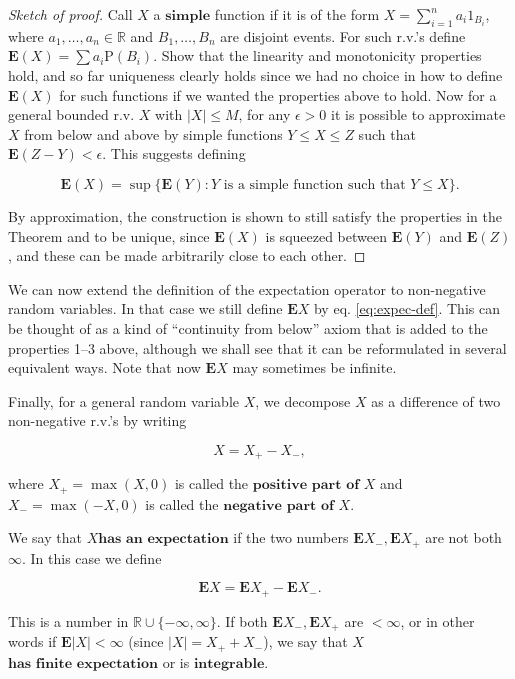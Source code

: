 \documentclass[11pt]{report}
\newcommand{\R}{\mathbb{R}}
\theoremstyle{plain}
\theoremstyle{definition}
\begin{document}
\begin{proof}[Sketch of proof]
Call $X$ a $\textbf{simple}$ function if it is of the
form $X=\sum_{i=1}^n a_i 1_{B_i}$, where
$a_1,\ldots,a_n\in \R$ and $B_1,\ldots,B_n$ are
disjoint events. For such r.v.'s define
$\mathbf{E}(X)=\sum a_i \mathrm{P}(B_i)$. Show that
the linearity and monotonicity properties hold, and so
far uniqueness clearly holds since we had no choice in
how to define $\mathbf{E}(X)$ for such functions if
we wanted the properties above to hold. Now for a
general bounded r.v. $X$ with $|X|\le M$, for any
$\epsilon>0$ it is possible to approximate $X$ from
below and above by simple functions $Y \le X \le Z$
such that $\mathbf{E}(Z-Y) < \epsilon$. This suggests
defining

\begin{equation*} \tag{5}\label{eq:expec-def}
\mathbf{E}(X) = \sup \{ \mathbf{E}(Y) : Y\textrm{ is a simple function such that }Y \le X \}.
\end{equation*}

\noindent By approximation, the construction is shown to still
satisfy the properties in the Theorem and to be
unique, since $\mathbf{E}(X)$ is squeezed between
$\mathbf{E}(Y)$ and $\mathbf{E}(Z)$, and these can be
made arbitrarily close to each other.
\end{proof}

\noindent We can now extend the definition of the expectation
operator to non-negative random variables. In that
case we still define $\mathbf{E} X$ by eq.
\eqref{eq:expec-def}. This can be thought of as a kind of
``continuity from below'' axiom that is added to the
properties 1--3 above, although we shall see that it
can be reformulated in several equivalent ways. Note
that now $\mathbf{E} X$ may sometimes be infinite.

Finally, for a general random variable $X$, we
decompose $X$ as a difference of two non-negative
r.v.'s by writing

\[
X = X_+ - X_-,
\]

\noindent where $X_+ = \max(X,0)$ is called the
$\textbf{positive part of } X$ and $X_-=\max(-X,0)$
is called the $\textbf{negative part of } X$.

We say that $X$$\textbf{has an expectation}$ if the
two numbers $\mathbf{E} X_-, \mathbf{E} X_+$ are not
both $\infty$. In this case we define

\[
\mathbf{E} X = \mathbf{E} X_+ - \mathbf{E} X_-.
\]

\noindent This is a number in $\R\cup\{ -\infty,\infty\}$. If
both $\mathbf{E} X_-, \mathbf{E} X_+$ are $<\infty$,
or in other words if $\mathbf{E} |X|<\infty$ (since
$|X|=X_+ + X_-$), we say that $X$$\textbf{has finite expectation}$ or is
$\textbf{integrable}$.
\end{document}
